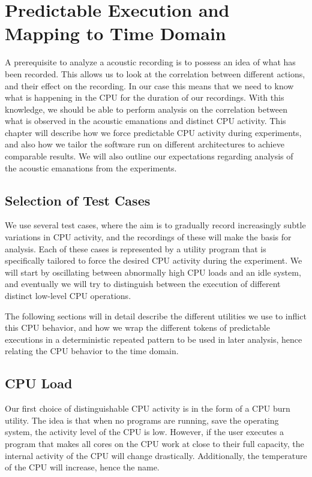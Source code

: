 \chapter{Predictable Execution and Mapping to Time Domain}\label{chp4:predictable_execution} 
A prerequisite to analyze a acoustic recording is to possess an idea of what has been recorded. 
This allows us to look at the correlation between different actions, and their effect on the recording.
In our case this means that we need to know what is happening in the \gls{CPU} for the duration of our recordings.
With this knowledge, we should be able to perform analysis on the correlation between what is observed in the acoustic emanations and distinct \gls{CPU} activity.
This chapter will describe how we force predictable \gls{CPU} activity during experiments, and also how we tailor the software run on different architectures to achieve comparable results.
We will also outline our expectations regarding analysis of the acoustic emanations from the experiments.

\section{Selection of Test Cases}
We use several test cases, where the aim is to gradually record increasingly subtle variations in \gls{CPU} activity, and the recordings of these will make the basis for analysis.
Each of these cases is represented by a utility program that is specifically tailored to force the desired \gls{CPU} activity during the experiment.
We will start by oscillating between abnormally high \gls{CPU} loads and an idle system, and eventually we will try to distinguish between the execution of different distinct low-level \gls{CPU} operations.

The following sections will in detail describe the different utilities we use to inflict this \gls{CPU} behavior, and how we wrap the different tokens of predictable executions in a deterministic repeated pattern to be used in later analysis, hence relating the \gls{CPU} behavior to the time domain.

\section{CPU Load}\label{chp4:sec:cpu_load}
Our first choice of distinguishable \gls{CPU} activity is in the form of a \gls{CPU} burn utility. 
The idea is that when no programs are running, save the operating system, the activity level of the \gls{CPU} is low. 
However, if the user executes a program that makes all cores on the \gls{CPU} work at close to their full capacity, the internal activity of the \gls{CPU} will change drastically.
Additionally, the temperature of the \gls{CPU} will increase, hence the name.

